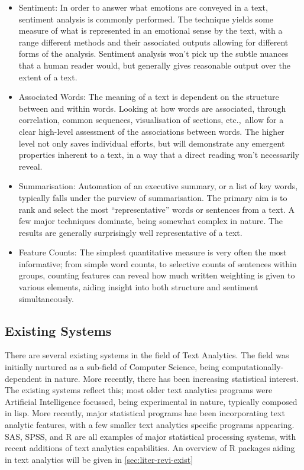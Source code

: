 \documentclass[11pt, a4paper, oneside]{report}
\begin{document}
\begin{itemize}
\item Sentiment: In order to answer what emotions are conveyed in a
  text, sentiment analysis is commonly performed. The technique yields
  some measure of what is represented in an emotional sense by the
  text, with a range different methods and their associated outputs
  allowing for different forms of the analysis. Sentiment analysis
  won't pick up the subtle nuances that a human reader would, but
  generally gives reasonable output over the extent of a text.
\item Associated Words: The meaning of a text is dependent on the
  structure between and within words. Looking at how words are
  associated, through correlation, common sequences, visualisation of
  sections, etc.,\ allow for a clear high-level assessment of the
  associations between words. The higher level not only saves
  individual efforts, but will demonstrate any emergent properties
  inherent to a text, in a way that a direct reading won't necessarily
  reveal.
\item Summarisation: Automation of an executive summary, or a list of
  key words, typically falls under the purview of summarisation. The
  primary aim is to rank and select the most ``representative'' words
  or sentences from a text. A few major techniques dominate, being
  somewhat complex in nature. The results are generally surprisingly
  well representative of a text.
\item Feature Counts: The simplest quantitative measure is very often
  the most informative; from simple word counts, to selective counts
  of sentences within groups, counting features can reveal how much
  written weighting is given to various elements, aiding insight into
  both structure and sentiment simultaneously.
\end{itemize}

\subsection{Existing Systems}
There are several existing systems in the field of Text Analytics. The
field was initially nurtured as a sub-field of Computer Science, being
computationally-dependent in nature. More recently, there has been
increasing statistical interest. The existing systems reflect this;
most older text analytics programs were Artificial Intelligence
focussed, being experimental in nature, typically composed in lisp.
More recently, major statistical programs hae been incorporating text
analytic features, with a few smaller text analytics specific programs
appearing. SAS, SPSS, and R are all examples of major statistical
processing systems, with recent additions of text analytics
capabilities. An overview of R packages aiding in text analytics will
be given in \autoref{sec:liter-revi-exist}
\end{document}
